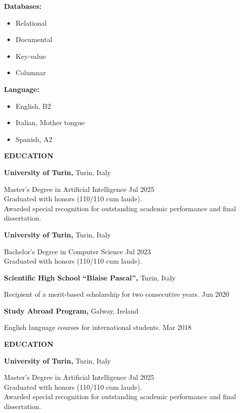 \documentclass[11pt]{article}
\begin{document}
\textbf{Databases:}
\begin{itemize}[noitemsep, topsep=0pt, partopsep=0pt, parsep=0pt]
    \item Relational
    \item Documental
    \item Key-value
    \item Columnar
\end{itemize}

\textbf{Language:} 
\begin{itemize}[noitemsep, topsep=0pt, partopsep=0pt, parsep=0pt]
    \item English, B2
    \item Italian, Mother tongue
    \item Spanish, A2
\end{itemize}
\vspace{8mm}

\textbf{EDUCATION}

\textbf{University of Turin,} Turin, Italy

Master’s Degree in Artificial Intelligence \hfill Jul 2025 \\
Graduated with honors (110/110 cum laude). \\
Awarded special recognition for outstanding academic performance and final dissertation.

\vspace{8pt}

\textbf{University of Turin,} Turin, Italy

Bachelor’s Degree in Computer Science \hfill Jul 2023 \\
Graduated with honors (110/110 cum laude).

\vspace{8pt}

\textbf{Scientific High School “Blaise Pascal”,} Turin, Italy

Recipient of a merit-based scholarship for two consecutive years. \hfill Jun 2020

\vspace{8pt}

\textbf{Study Abroad Program,} Galway, Ireland

English language courses for international students. \hfill Mar 2018

\textbf{EDUCATION}

\textbf{University of Turin,} Turin, Italy

Master’s Degree in Artificial Intelligence \hfill Jul 2025 \\
Graduated with honors (110/110 cum laude). \\
Awarded special recognition for outstanding academic performance and final dissertation.
\end{document}
